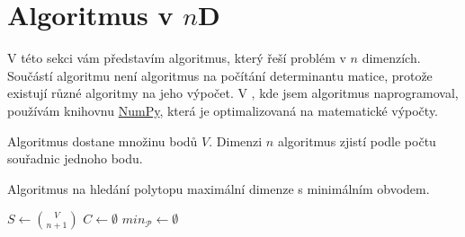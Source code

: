 \section{Algoritmus v \texorpdfstring{$n$D}{nD}}
V této sekci vám představím algoritmus, který řeší problém v $n$ dimenzích. Součástí algoritmu není algoritmus na počítání determinantu matice, protože existují různé algoritmy na jeho výpočet. V , kde jsem algoritmus naprogramoval, používám knihovnu \href{https://numpy.org/doc/stable/index.html}{NumPy}, která je optimalizovaná na matematické výpočty. 

Algoritmus dostane množinu bodů $V$. Dimenzi $n$ algoritmus zjistí podle počtu souřadnic jednoho bodu.

\begin{algorithm}[H]
    \caption{Algoritmus na hledání polytopu maximální dimenze s minimálním obvodem.}
    \label{alg:algoritmus_nd}


    \BlankLine
    \BlankLine

    $S \leftarrow \binom{V}{n+1}$\;
    $C \leftarrow \emptyset$\; 
    $min_\mathcal{P} \leftarrow \emptyset$\;
    \KwReturn{$\emptyset$}\;
   \end{algorithm}